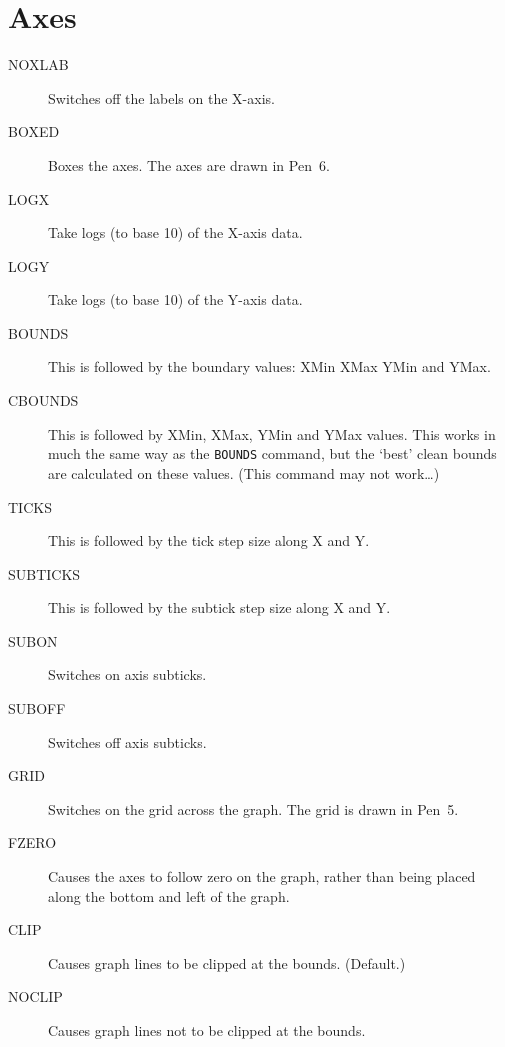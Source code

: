 \documentclass{report}
\begin{document}
\section{Axes}
\begin{description}
\item[NOXLAB] Switches off the labels on the X-axis.
\item[BOXED]  Boxes the axes. The axes are drawn in Pen~6.
\item[LOGX] Take logs (to base 10) of the X-axis data.
\item[LOGY] Take logs (to base 10) of the Y-axis data.
\item[BOUNDS] This is followed by the boundary values: XMin XMax YMin and YMax.
\item[CBOUNDS\dag] This is followed by XMin, XMax, YMin and YMax values. This works 
in much the same way as the {\tt BOUNDS} command, but the `best' clean bounds are 
calculated on these values. (This command may not work\ldots)
\item[TICKS]  This is followed by the tick step size along X and Y.
\item[SUBTICKS]  This is followed by the subtick step size along X and Y.
\item[SUBON] Switches on axis subticks.
\item[SUBOFF] Switches off axis subticks.
\item[GRID] Switches on the grid across the graph. The grid is drawn in Pen~5.
\item[FZERO] Causes the axes to follow zero on the graph, rather than being 
placed along the bottom and left of the graph.
\item[CLIP] Causes graph lines to be clipped at the bounds. (Default.)
\item[NOCLIP] Causes graph lines not to be clipped at the bounds.
\end{description}
\end{document}
